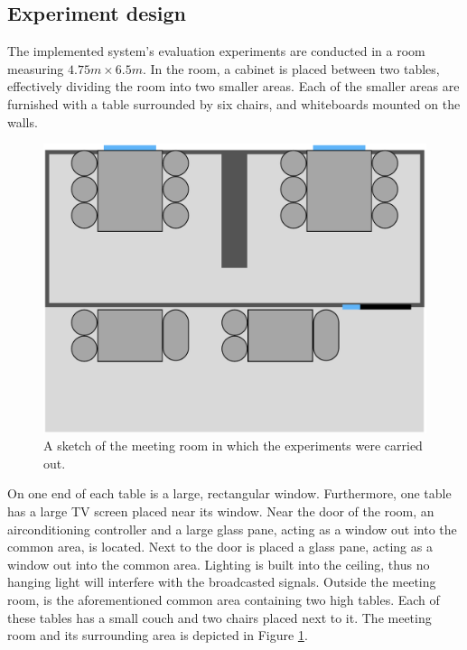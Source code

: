 \subsection{Experiment design}\label{sec:experiment_design}
The implemented system's evaluation experiments are conducted in a room measuring $4.75m \times 6.5m$.
In the room, a cabinet is placed between two tables, effectively dividing the room into two smaller areas. 
Each of the smaller areas are furnished with a table surrounded by six chairs, and whiteboards mounted on the walls.
\begin{figure}[h]
    \centering
    \includegraphics[scale=0.5]{images/experiment_room.png}
    \caption{A sketch of the meeting room in which the experiments were carried out.}
    \label{fig:experiment_room}
\end{figure}
On one end of each table is a large, rectangular window.
Furthermore, one table has a large TV screen placed near its window. 
Near the door of the room, an airconditioning controller and a large glass pane, acting as a window out into the common area, is located. 
Next to the door is placed a glass pane, acting as a window out into the common area. 
Lighting is built into the ceiling, thus no hanging light will interfere with the broadcasted signals. 
Outside the meeting room, is the aforementioned common area containing two high tables.
Each of these tables has a small couch and two chairs placed next to it.
The meeting room and its surrounding area is depicted in Figure \ref{fig:experiment_room}.

